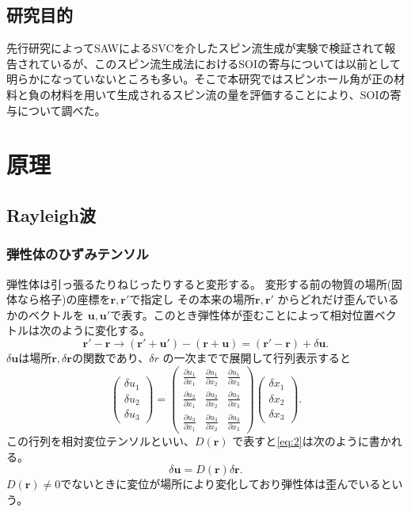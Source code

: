 \documentclass[dvipdfmx]{jsreport}
\numberwithin{equation}{chapter}
\numberwithin{table}{chapter}
\begin{document}
\section{研究目的}
先行研究によってSAWによるSVCを介したスピン流生成が実験で検証されて報告されているが、このスピン流生成法におけるSOIの寄与については以前として明らかになっていないところも多い。そこで本研究ではスピンホール角が正の材料と負の材料を用いて生成されるスピン流の量を評価することにより、SOIの寄与について調べた。
\chapter{原理}
\section{Rayleigh波}
\subsection{弾性体のひずみテンソル}
弾性体は引っ張るたりねじったりすると変形する。
変形する前の物質の場所(固体なら格子)の座標を$\bm{r},\bm{r}'$で指定し
その本来の場所$\bm{r},\bm{r}'$ からどれだけ歪んでいるかのベクトルを
$ \bm{u},\bm{u}'$で表す。このとき弾性体が歪むことによって相対位置ベクトルは次のように変化する。
\begin{equation}
\label{eq:1}
\bm{r}'-\bm{r} \to (\bm{r}'+\bm{u}')-(\bm{r}+\bm{u})=(\bm{r}'-\bm{r})+\delta \bm{u}
.\end{equation}
$\delta \bm{u}$は場所$\bm{r},\delta \bm{r}$の関数であり、$\delta r$ の一次までで展開して行列表示すると
\begin{equation}
\label{eq:2}
\begin{pmatrix} \delta u_1\\\delta u_2\\\delta u_3 \end{pmatrix} =
\begin{pmatrix} 
\frac{\partial u_1}{\partial x_1 }&\frac{\partial u_1}{\partial x_2 }&\frac{\partial u_1}{\partial x_3} \\ \frac{\partial u_2}{\partial x_1}&\frac{\partial u_2}{\partial x_2}&\frac{\partial u_2}{\partial x_3 }\\ \frac{\partial u_3}{\partial x_1} & \frac{\partial u_3}{\partial x_2} &\frac{\partial u_3}{\partial x_3} \end{pmatrix} 
\begin{pmatrix} \delta x_1\\\delta x_2 \\ \delta x_3 \end{pmatrix} 
.\end{equation}
この行列を相対変位テンソルといい、$D(\bm{r})$ で表すと\eqref{eq:2}は次のように書かれる。
\begin{equation}
\label{eq:3}
	\delta \bm{u} = D(\bm{r}) \delta \bm{r}
.\end{equation}
$D(\bm{r})\neq 0$でないときに変位が場所により変化しており弾性体は歪んでいるという。
\end{document}
